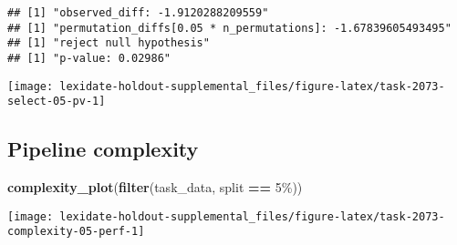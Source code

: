 \documentclass[
]{book}
\newenvironment{Shaded}{\begin{snugshade}}{\end{snugshade}}
\newcommand{\AttributeTok}[1]{\textcolor[rgb]{0.13,0.29,0.53}{#1}}
\newcommand{\DecValTok}[1]{\textcolor[rgb]{0.00,0.00,0.81}{#1}}
\newcommand{\FunctionTok}[1]{\textcolor[rgb]{0.13,0.29,0.53}{\textbf{#1}}}
\newcommand{\NormalTok}[1]{#1}
\newcommand{\OtherTok}[1]{\textcolor[rgb]{0.56,0.35,0.01}{#1}}
\newcommand{\SpecialCharTok}[1]{\textcolor[rgb]{0.81,0.36,0.00}{\textbf{#1}}}
\newcommand{\StringTok}[1]{\textcolor[rgb]{0.31,0.60,0.02}{#1}}
\begin{document}
\begin{Shaded}
\end{Shaded}

\begin{verbatim}
## [1] "observed_diff: -1.9120288209559"
## [1] "permutation_diffs[0.05 * n_permutations]: -1.67839605493495"
## [1] "reject null hypothesis"
## [1] "p-value: 0.02986"
\end{verbatim}

\texttt{[image: lexidate-holdout-supplemental\_files/figure-latex/task-2073-select-05-pv-1]}

\hypertarget{pipeline-complexity-38}{%
\subsection{Pipeline complexity}\label{pipeline-complexity-38}}

\begin{Shaded}
\begin{Highlighting}[]
\FunctionTok{complexity\_plot}\NormalTok{(}\FunctionTok{filter}\NormalTok{(task\_data, split }\SpecialCharTok{==} \StringTok{\textquotesingle{}5\%\textquotesingle{}}\NormalTok{))}
\end{Highlighting}
\end{Shaded}

\texttt{[image: lexidate-holdout-supplemental\_files/figure-latex/task-2073-complexity-05-perf-1]}
\end{document}
